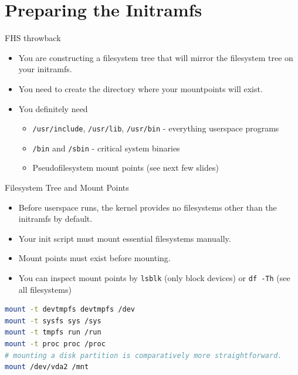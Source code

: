 \documentclass{../lecture}
\begin{document}
\section{Preparing the Initramfs}

\begin{frame}{FHS throwback}
  \begin{itemize}
    \item You are constructing a filesystem tree that will mirror the filesystem
      tree on your initramfs.
    \item You need to create the directory where your mountpoints will exist.
    \item You definitely need
    \begin{itemize}
      \item \texttt{/usr/include}, \texttt{/usr/lib}, \texttt{/usr/bin} -
        everything userspace programs
      \item \texttt{/bin} and \texttt{/sbin} - critical system binaries
      \item Pseudofilesystem mount points (see next few slides)
    \end{itemize}
  \end{itemize}
\end{frame}

\begin{frame}[fragile]{Filesystem Tree and Mount Points}
  \begin{itemize}
    \item Before userspace runs, the kernel provides no filesystems other than
      the initramfs by default.
    \item Your init script must mount essential filesystems manually.
    \item Mount points must exist before mounting.
    \item You can inspect mount points by \texttt{lsblk} (only block devices) or
      \texttt{df -Th} (see all filesystems)
  \end{itemize}
\begin{lstlisting}[language=bash]
mount -t devtmpfs devtmpfs /dev
mount -t sysfs sys /sys
mount -t tmpfs run /run
mount -t proc proc /proc
# mounting a disk partition is comparatively more straightforward.
mount /dev/vda2 /mnt
\end{lstlisting}
\end{frame}
\end{document}
